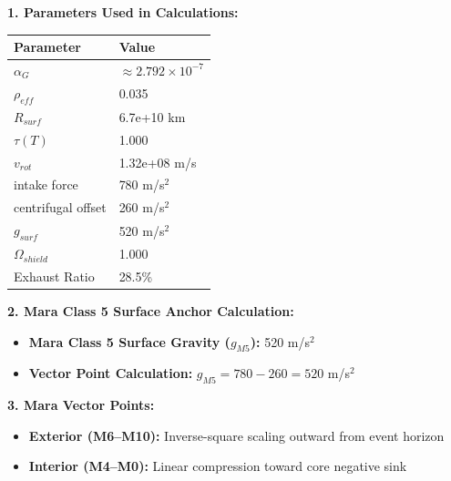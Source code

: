 \documentclass[11pt, a4paper]{article}
\begin{document}
\vspace{0.5em}
\noindent \textbf{1. Parameters Used in Calculations:}
\begin{center}
  \begin{tabular}{|l|l|}
    \hline
    \textbf{Parameter} & \textbf{Value} \\ \hline
    $\alpha_G$ & $\approx 2.792 \times 10^{-7}$ \\ \hline
    $\rho_{eff}$ & 0.035 \\ \hline
    $R_{surf}$ & 6.7e+10 km \\ \hline
    $\tau(T)$ & 1.000 \\ \hline
    $v_{rot}$ & 1.32e+08 m/s \\ \hline
    intake force & 780 m/s$^2$ \\ \hline
    centrifugal offset & 260 m/s$^2$ \\ \hline
    $g_{surf}$ & 520 m/s$^2$ \\ \hline
    $\Omega_{shield}$ & 1.000 \\ \hline
    Exhaust Ratio & 28.5\% \\ \hline
  \end{tabular}
\end{center}

\vspace{0.5em}
\noindent \textbf{2. Mara Class 5 Surface Anchor Calculation:}
\begin{itemize}
  \item \textbf{Mara Class 5 Surface Gravity ($g_{M5}$):} 520 m/s$^2$
  \item \textbf{Vector Point Calculation:} $g_{M5} = 780 - 260 = 520$ m/s$^2$
\end{itemize}

\vspace{0.5em}
\noindent \textbf{3. Mara Vector Points:}
\begin{itemize}
  \item \textbf{Exterior (M6--M10):} Inverse-square scaling outward from event horizon
  \item \textbf{Interior (M4--M0):} Linear compression toward core negative sink
\end{itemize}
\end{document}
